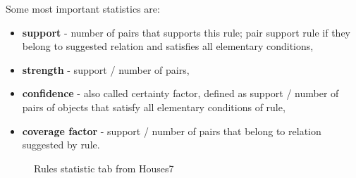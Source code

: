 Some most important statistics are:
\begin{itemize}
	\item \textbf{support} - number of pairs that supports this rule; pair support rule if they belong to suggested relation and satisfies all elementary conditions,
	\item \textbf{strength} - support / number of pairs,
	\item \textbf{confidence} - also called certainty factor, defined as support / number of pairs of objects that satisfy all elementary conditions of rule,
	\item \textbf{coverage factor} - support / number of pairs that belong to relation suggested by rule.
\end{itemize}

\begin{figure*}[!ht] 
	\centering
	\caption{Rules statistic tab from Houses7}
\end{figure*}

\vfill\newpage
